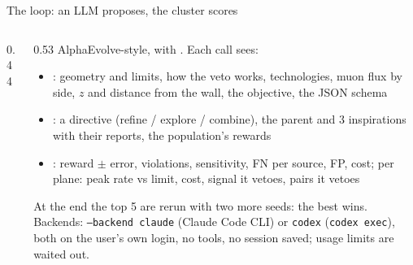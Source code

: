 \documentclass[aspectratio=169,10pt]{beamer}
\begin{document}
\begin{frame}{The loop: an LLM proposes, the cluster scores}
  \begin{columns}[c]
    \begin{column}{0.44\textwidth}\centering
    \end{column}
    \begin{column}{0.53\textwidth}\footnotesize
      AlphaEvolve-style, with . Each call sees:
      \begin{itemize}\scriptsize
        \item {}: geometry and limits, how the veto works, technologies, muon flux by side, $z$ and distance from the wall, the objective, the JSON schema
        \item {}: a directive (refine / explore / combine), the parent and 3 inspirations with their reports, the population's rewards
        \item {}: reward $\pm$ error, violations, sensitivity, FN per source, FP, cost; per plane: peak rate vs limit, cost, signal it vetoes, pairs it vetoes
      \end{itemize}
      At the end the top 5 are rerun with two more seeds: the best  wins.\\[1mm]
      Backends: \texttt{--backend claude} (Claude Code CLI) or \texttt{codex} (\texttt{codex exec}), both on the user's own login, no tools, no session saved; usage limits are waited out.\\[1mm]
    \end{column}
  \end{columns}
\end{frame}
\end{document}
